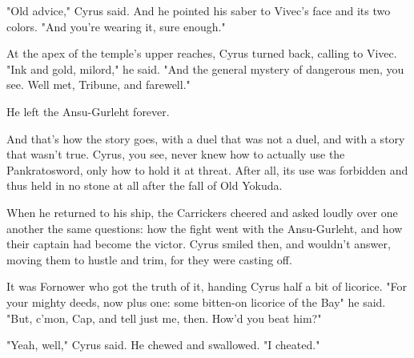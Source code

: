 "Old advice," Cyrus said. And he pointed his saber to Vivec's face and its two colors. "And you're wearing it, sure enough."

At the apex of the temple's upper reaches, Cyrus turned back, calling to Vivec. "Ink and gold, milord," he said. "And the general mystery of dangerous men, you see. Well met, Tribune, and farewell."

He left the Ansu-Gurleht forever.

And that's how the story goes, with a duel that was not a duel, and with a story that wasn't true. Cyrus, you see, never knew how to actually use the Pankratosword, only how to hold it at threat. After all, its use was forbidden and thus held in no stone at all after the fall of Old Yokuda.

When he returned to his ship, the Carrickers cheered and asked loudly over one another the same questions: how the fight went with the Ansu-Gurleht, and how their captain had become the victor. Cyrus smiled then, and wouldn't answer, moving them to hustle and trim, for they were casting off.

It was Fornower who got the truth of it, handing Cyrus half a bit of licorice. "For your mighty deeds, now plus one: some bitten-on licorice of the Bay" he said. "But, c'mon, Cap, and tell just me, then. How'd you beat him?"

"Yeah, well," Cyrus said. He chewed and swallowed. "I cheated."